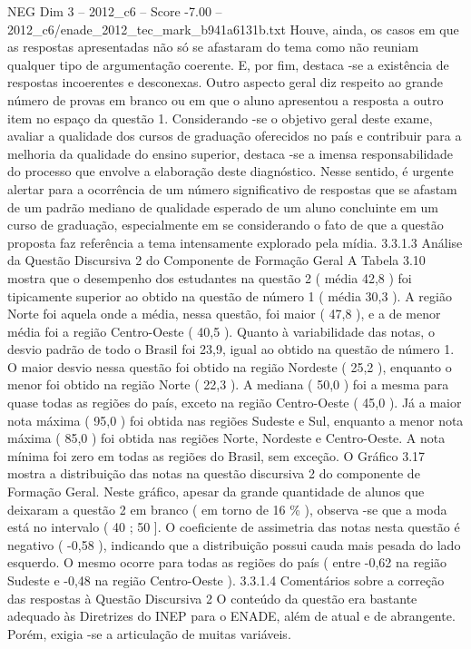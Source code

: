 \begin{textsample}{NEG Dim 3 – 2012\_c6 – Score -7.00 – 2012\_c6/enade\_2012\_tec\_mark\_b941a6131b.txt}
Houve, ainda, os casos em que as respostas apresentadas não só se afastaram do tema como não reuniam qualquer tipo de argumentação coerente.
E, por fim, destaca -se a existência de respostas incoerentes e desconexas.
Outro aspecto geral diz respeito ao grande número de provas em branco ou em que o aluno apresentou a resposta a outro item no espaço da questão 1.
Considerando -se o objetivo geral deste exame, avaliar a qualidade dos cursos de graduação oferecidos no país e contribuir para a melhoria da qualidade do ensino superior, destaca -se a imensa responsabilidade do processo que envolve a elaboração deste diagnóstico.
Nesse sentido, é urgente alertar para a ocorrência de um número significativo de respostas que se afastam de um padrão mediano de qualidade esperado de um aluno concluinte em um curso de graduação, especialmente em se considerando o fato de que a questão proposta faz referência a tema intensamente explorado pela mídia. 3.3.1.3 Análise da Questão Discursiva 2 do Componente de Formação Geral A Tabela 3.10 mostra que o desempenho dos estudantes na questão 2 ( média 42,8 ) foi tipicamente superior ao obtido na questão de número 1 ( média 30,3 ).
A região Norte foi aquela onde a média, nessa questão, foi maior ( 47,8 ), e a de menor média foi a região Centro-Oeste ( 40,5 ).
Quanto à variabilidade das notas, o desvio padrão de todo o Brasil foi 23,9, igual ao obtido na questão de número 1.
O maior desvio nessa questão foi obtido na região Nordeste ( 25,2 ), enquanto o menor foi obtido na região Norte ( 22,3 ).
A mediana ( 50,0 ) foi a mesma para quase todas as regiões do país, exceto na região Centro-Oeste ( 45,0 ).
Já a maior nota máxima ( 95,0 ) foi obtida nas regiões Sudeste e Sul, enquanto a menor nota máxima ( 85,0 ) foi obtida nas regiões Norte, Nordeste e Centro-Oeste.
A nota mínima foi zero em todas as regiões do Brasil, sem exceção.
O Gráfico 3.17 mostra a distribuição das notas na questão discursiva 2 do componente de Formação Geral.
Neste gráfico, apesar da grande quantidade de alunos que deixaram a questão 2 em branco ( em torno de 16 \% ), observa -se que a moda está no intervalo ( 40 ; 50 ].
O coeficiente de assimetria das notas nesta questão é negativo ( -0,58 ), indicando que a distribuição possui cauda mais pesada do lado esquerdo.
O mesmo ocorre para todas as regiões do país ( entre -0,62 na região Sudeste e -0,48 na região Centro-Oeste ). 3.3.1.4 Comentários sobre a correção das respostas à Questão Discursiva 2 O conteúdo da questão era bastante adequado às Diretrizes do INEP para o ENADE, além de atual e de abrangente.
Porém, exigia -se a articulação de muitas variáveis.

\end{textsample}
